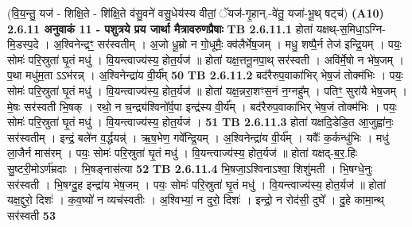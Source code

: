 \documentclass[17pt]{extarticle}
\begin{document}
                                (वि॒य॒न्तु॒ यज॑ - शिक्षि॒ते - शि॑क्षि॒ते व॑सु॒वने॑ वसु॒धेय॑स्य वीतां॒ ॅयज॑-गृ॒हान्.-वे॑तु॒ यजा॑-भू॒थ् षट्च॑) \textbf{(A10)} \newline \newline
                \textbf{ 2.6.11    अनुवाकं   11 - पशुत्रये प्रय जार्था मैत्रावरुणप्रैषाः} \newline
                                \textbf{ TB 2.6.11.1} \newline
                  होता॑ यक्षथ्-स॒मिधा॒ऽग्नि-मि॒डस्प॒दे । अ॒श्विनेन्द्रꣳ॒॒ सर॑स्वतीम् । अ॒जो धू॒म्रो न गो॒धूमैः॒ क्व॑लैर्भेष॒जम् । मधु॒ शष्पै॒र्न तेज॑ इन्द्रि॒यम् । पयः॒ सोमः॑ परि॒स्रुता॑ घृ॒तं मधु॑ । वि॒यन्त्वाज्य॑स्य॒ होत॒र्यज॑ ॥ होता॑ यक्ष॒त्तनू॒नपा॒थ् सर॑स्वती । अवि॑र्मे॒षो न भे॑ष॒जम् । प॒था मधु॑म॒ता ऽऽभ॑रन्न् । अ॒श्विनेन्द्रा॑य वी॒र्य᳚म् \textbf{ 50} \newline
                  \newline
                                \textbf{ TB 2.6.11.2} \newline
                  बद॑रैरुप॒वाका॑भिर् भेष॒जं तोक्म॑भिः । पयः॒ सोमः॑ परि॒स्रुता॑ घृ॒तं मधु॑ । वि॒यन्त्वाज्य॑स्य॒ होत॒र्यज॑ ॥ होता॑ यक्ष॒न्नरा॒शꣳस॒नं न॒ग्नहु᳚म् । पतिꣳ॒॒ सुरा॑यै भेष॒जम् । मे॒षः सर॑स्वती भि॒षक् । रथो॒ न च॒न्द्र्य॑श्विनो᳚र्व॒पा इन्द्र॑स्य वी॒र्य᳚म् । बद॑रैरुप॒वाका॑भिर् भेष॒जं तोक्म॑भिः । पयः॒ सोमः॑ परि॒स्रुता॑ घृ॒तं मधु॑ । वि॒यन्त्वाज्य॑स्य॒ होत॒र्यज॑ । \textbf{ 51} \newline
                  \newline
                                \textbf{ TB 2.6.11.3} \newline
                  होता॑ यक्षदि॒डेडि॒त आ॒जुह्वा॑नः॒ सर॑स्वतीम् । इन्द्रं॒ बले॑न व॒र्द्धयन्न्॑ । ऋ॒ष॒भेण॒ गवे᳚न्द्रि॒यम् । अ॒श्विनेन्द्रा॑य वी॒र्य᳚म् । यवैः᳚ क॒र्कन्धु॑भिः । मधु॑ ला॒जैर्न मास॑रम् । पयः॒ सोमः॑ परि॒स्रुता॑ घृ॒तं मधु॑ । वि॒यन्त्वाज्य॑स्य॒ होत॒र्यज॑ ॥ होता॑ यक्षद्-ब॒र॒.हिः सु॒ष्टरी॒मोऽर्ण॑म्रदाः । भि॒षङ्नास॑त्या \textbf{ 52} \newline
                  \newline
                                \textbf{ TB 2.6.11.4} \newline
                  भि॒षजा॒ऽश्विनाऽश्वा॒ शिशु॑मती । भि॒षग्धे॒नुः सर॑स्वती । भि॒षग्दु॒ह इन्द्रा॑य भेष॒जम् । पयः॒ सोमः॑ परि॒स्रुता॑ घृ॒तं मधु॑ । वि॒यन्त्वाज्य॑स्य॒ होत॒र्यज॑ ॥ होता॑ यक्ष॒द्दुरो॒ दिशः॑ । क॒व॒ष्यो॑ न व्यच॑स्वतीः । अ॒श्विभ्यां॒ न दुरो॒ दिशः॑ । इन्द्रो॒ न रोद॑सी॒ दुघे᳚ । दु॒हे कामा॒न्थ् सर॑स्वती \textbf{ 53} \newline
                  \newline
\end{document}
